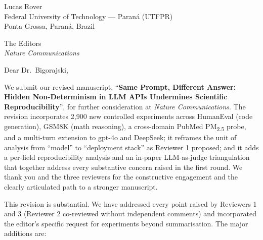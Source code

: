 \documentclass[11pt,a4paper]{article}
\begin{document}
\begin{flushright}
Lucas Rover\\
Federal University of Technology --- Paraná (UTFPR)\\
Ponta Grossa, Paraná, Brazil\\

\end{flushright}

\bigskip

\noindent The Editors\\
\emph{Nature Communications}\\

\bigskip

Dear Dr.\ Bigorajski,

We submit our revised manuscript, ``\textbf{Same Prompt, Different Answer: Hidden Non-Determinism in LLM APIs Undermines Scientific Reproducibility}'', for further consideration at \emph{Nature Communications}. The revision incorporates 2{,}900 new controlled experiments across HumanEval (code generation), GSM8K (math reasoning), a cross-domain PubMed PM\textsubscript{2.5} probe, and a multi-turn extension to gpt-4o and DeepSeek; it reframes the unit of analysis from ``model'' to ``deployment stack'' as Reviewer 1 proposed; and it adds a per-field reproducibility analysis and an in-paper LLM-as-judge triangulation that together address every substantive concern raised in the first round. We thank you and the three reviewers for the constructive engagement and the clearly articulated path to a stronger manuscript.

This revision is substantial. We have addressed every point raised by Reviewers 1 and 3 (Reviewer 2 co-reviewed without independent comments) and incorporated the editor's specific request for experiments beyond summarisation. The major additions are:
\end{document}
